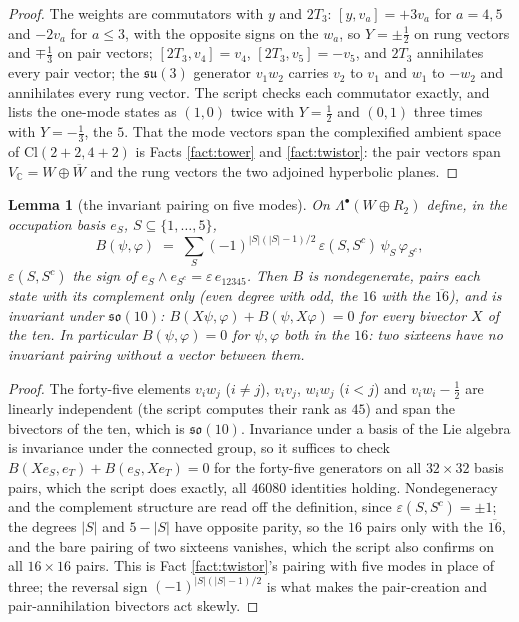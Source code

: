 \documentclass[11pt]{article}
\newtheorem{lemma}[theorem]{Lemma}
\theoremstyle{definition}
\newcommand{\Cl}{\mathrm{Cl}}
\newcommand{\C}{\mathbb{C}}
\newcommand{\su}{\mathfrak{su}}
\newcommand{\so}{\mathfrak{so}}
\begin{document}
\begin{proof}
The weights are commutators with $y$ and $2T_{3}$: $[y, v_{a}] = +3v_{a}$ for $a = 4, 5$ and $-2v_{a}$ for $a \le 3$, with the opposite signs on the $w_{a}$, so $Y = \pm\tfrac12$ on rung vectors and $\mp\tfrac13$ on pair vectors; $[2T_{3}, v_{4}] = v_{4}$, $[2T_{3}, v_{5}] = -v_{5}$, and $2T_{3}$ annihilates every pair vector; the $\su(3)$ generator $v_{1}w_{2}$ carries $v_{2}$ to $v_{1}$ and $w_{1}$ to $-w_{2}$ and annihilates every rung vector. The script checks each commutator exactly, and lists the one-mode states as $(1,0)$ twice with $Y = \tfrac12$ and $(0,1)$ three times with $Y = -\tfrac13$, the $5$. That the mode vectors span the complexified ambient space of $\Cl(2{+}2, 4{+}2)$ is Facts \ref{fact:tower} and \ref{fact:twistor}: the pair vectors span $V_{\C} = W \oplus \overline{W}$ and the rung vectors the two adjoined hyperbolic planes.
\end{proof}

\begin{lemma}[the invariant pairing on five modes]\label{lem:pairing}
On $\Lambda^{\bullet}(W \oplus R_{2})$ define, in the occupation basis $e_{S}$, $S \subseteq \{1, \ldots, 5\}$,
\[
B(\psi, \varphi) \;=\; \sum_{S} (-1)^{|S|(|S|-1)/2}\,\varepsilon(S, S^{c})\,\psi_{S}\,\varphi_{S^{c}},
\]
$\varepsilon(S, S^{c})$ the sign of $e_{S} \wedge e_{S^{c}} = \varepsilon\, e_{12345}$. Then $B$ is nondegenerate, pairs each state with its complement only (even degree with odd, the $16$ with the $\overline{16}$), and is invariant under $\so(10)$: $B(X\psi, \varphi) + B(\psi, X\varphi) = 0$ for every bivector $X$ of the ten. In particular $B(\psi, \varphi) = 0$ for $\psi, \varphi$ both in the $16$: two sixteens have no invariant pairing without a vector between them.
\end{lemma}

\begin{proof}
The forty-five elements $v_{i}w_{j}$ ($i \ne j$), $v_{i}v_{j}$, $w_{i}w_{j}$ ($i < j$) and $v_{i}w_{i} - \tfrac12$ are linearly independent (the script computes their rank as $45$) and span the bivectors of the ten, which is $\so(10)$. Invariance under a basis of the Lie algebra is invariance under the connected group, so it suffices to check $B(Xe_{S}, e_{T}) + B(e_{S}, Xe_{T}) = 0$ for the forty-five generators on all $32 \times 32$ basis pairs, which the script does exactly, all $46080$ identities holding. Nondegeneracy and the complement structure are read off the definition, since $\varepsilon(S, S^{c}) = \pm 1$; the degrees $|S|$ and $5 - |S|$ have opposite parity, so the $16$ pairs only with the $\overline{16}$, and the bare pairing of two sixteens vanishes, which the script also confirms on all $16 \times 16$ pairs. This is Fact \ref{fact:twistor}'s pairing with five modes in place of three; the reversal sign $(-1)^{|S|(|S|-1)/2}$ is what makes the pair-creation and pair-annihilation bivectors act skewly.
\end{proof}
\end{document}
